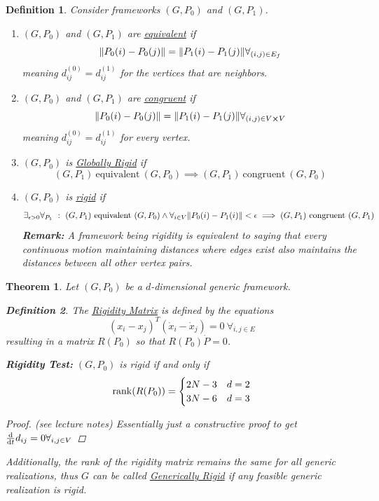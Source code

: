 \documentclass[]{article}
\numberwithin{equation}{section}
\newcommand{\st}{\ : \ }
\newtheorem{definition}{Definition}
\newtheorem{theorem}{Theorem}
\begin{document}
\begin{definition}\label{def:rigid_frame_def}
    Consider frameworks $(G, P_0)$ and $(G, P_1)$.
    \begin{enumerate}
        \item $(G, P_0)$ and $(G, P_1)$ are \emph{\underline{equivalent}} if \[
            \norm{P_0(i) - P_0(j)} = \norm{P_1(i) - P_1(j)} \forall_{(i,j) \in E_f}
        \] meaning $d_{ij}^{(0)} = d_{ij}^{(1)}$ for the vertices that are neighbors.
        \item $(G, P_0)$ and $(G, P_1)$ are \emph{\underline{congruent}} if \[
            \norm{P_0(i) - P_0(j)} = \norm{P_1(i) - P_1(j)} \forall_{(i,j) \in V \cross V}
        \] meaning $d_{ij}^{(0)} = d_{ij}^{(1)}$ for every vertex.
        \item $(G, P_0)$ is \emph{\underline{Globally Rigid}} if \[
            (G, P_1) \ \text{equivalent} \ (G, P_0) \implies (G, P_1) \ \text{congruent} \ (G, P_0)
        \]
        \item $(G, P_0)$ is \emph{\underline{rigid}} if \[
            \exists_{\epsilon>0} \forall_{P_1} \st
            (G, P_1) \ \text{equivalent} \ (G, P_0) 
                \land \forall_{i \in V}  \norm{P_0(i) - P_1(i)} < \epsilon 
            \implies (G, P_1) \ \text{congruent} \ (G, P_1)
        \]
        \textbf{Remark:}
        A framework being rigidity is equivalent to saying that every continuous motion maintaining distances where edges exist also maintains the distances between all other vertex pairs.
    \end{enumerate}
\end{definition}

\begin{theorem} \label{thm:rigid_test}
    Let $(G, P_0)$ be a $d$-dimensional generic framework.
    \begin{definition} \label{def:rigid_matrix}
        The \emph{\underline{Rigidity Matrix}} is defined by the equations \[
            (x_i - x_j)^T (\dot{x}_i - \dot{x}_j) = 0 \ \forall_{i,j \in E}
        \] resulting in a matrix $R(P_0)$ so that $R(P_0) \dot{P} = 0$.
    \end{definition}
    \textbf{Rigidity Test:} $(G, P_0)$ is rigid if and only if \[
        \rank(R(P_0)) = \begin{cases}
            2N - 3 & d=2\\
            3N - 6 & d=3
        \end{cases}
    \] 
    \begin{proof}
        (see lecture notes)
        Essentially just a constructive proof to get $\dv{t} d_{ij} = 0 \forall_{i,j \in V}$
    \end{proof}
    Additionally, the rank of the rigidity matrix remains the same for all generic realizations, thus $G$ can be called \emph{\underline{Generically Rigid}} if any feasible generic realization is rigid.
\end{theorem}
\end{document}
